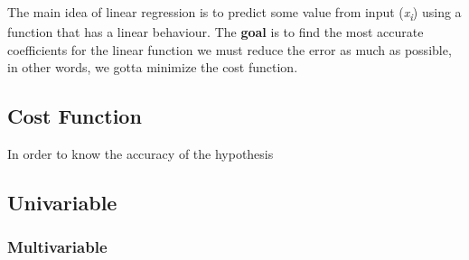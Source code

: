 The main idea of linear regression is to predict some value from input (\textit{x\textsubscript{i}}) using a function that has a linear behaviour. The \textbf{goal} is to find the most accurate coefficients for the linear function we must reduce the error as much as possible, in other words, we gotta minimize the cost function.

\subsection{Cost Function}
In order to know the accuracy of the hypothesis

\subsection{Univariable}


\subsubsection{Multivariable}
